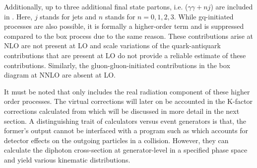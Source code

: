 Additionally, up to three additional final state partons, i.e. ($\gamma\gamma + nj$) are included in \SHERPA. Here, $j$ stands for jets and $n$ stands for $n = 0, 1, 2, 3$. While gq-initiated processes are also possible, it is formally a higher-order term and is suppressed compared to the box process due to the same reason. These contributions arise at NLO are not present at LO and scale variations of the quark-antiquark contributions that are present at LO do not provide a reliable estimate of these contributions. Similarly, the gluon-gluon-initiated contributions in the box diagram at NNLO are absent at LO. 




It must be noted that \SHERPA only includes the real radiation component of these higher order processes. The virtual corrections will later on be accounted in the K-factor corrections calculated from \MCFM which will be discussed in more detail in the next section. A distinguishing trait of calculators versus event generators is that, the former's output cannot be interfaced with a program such as  which accounts for detector effects on the outgoing particles in a collision. However, they can calculate the diphoton cross-section at generator-level in a specified phase space and yield various kinematic distributions.

